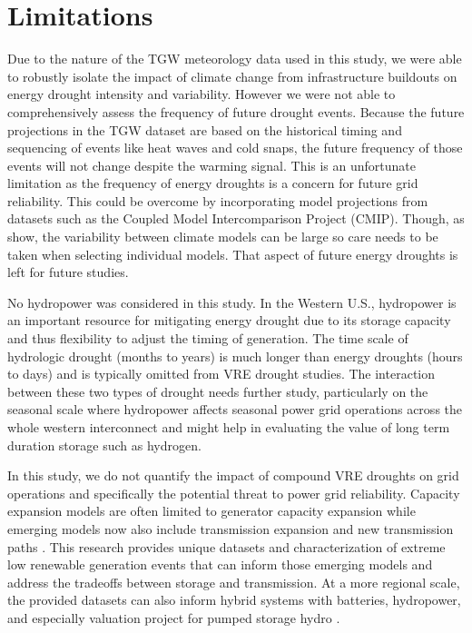 \documentclass{agujournal2019}
\begin{document}
\section{Limitations}

Due to the nature of the TGW meteorology data used in this study, we were able to robustly isolate the impact of climate change from infrastructure buildouts on energy drought intensity and variability. However we were not able to comprehensively assess the frequency of future drought events. Because the future projections in the TGW dataset are based on the historical timing and sequencing of events like heat waves and cold snaps, the future frequency of those events will not change despite the warming signal. This is an unfortunate limitation as the frequency of energy droughts is a concern for future grid reliability. This could be overcome by incorporating model projections from datasets such as the Coupled Model Intercomparison Project (CMIP). Though, as  show, the variability between climate models can be large so care needs to be taken when selecting individual models. That aspect of future energy droughts is left for future studies.

No hydropower was considered in this study. In the Western U.S., hydropower is an important resource for mitigating energy drought due to its storage capacity and thus flexibility to adjust the timing of generation. The time scale of hydrologic drought (months to years) is much longer than energy droughts (hours to days) and is typically omitted from VRE drought studies. The interaction between these two types of drought needs further study, particularly on the seasonal scale where hydropower affects seasonal power grid operations across the whole western interconnect \cite{Voisin_2018,Hill_2021} and might help in evaluating the value of long term duration storage such as hydrogen.

In this study, we do not quantify the impact of compound VRE droughts on grid operations and specifically the potential threat to power grid reliability. Capacity expansion models are often limited to generator capacity expansion while emerging models now also include transmission expansion and new transmission paths \cite{Gonzalez_Romero_2020}. This research provides unique datasets and characterization of extreme low renewable generation events that can inform those emerging models and address the tradeoffs between storage and transmission. At a more regional scale, the provided datasets can also inform hybrid systems with batteries, hydropower, and especially valuation project for pumped storage hydro \cite{Francois2016}. 
\end{document}
